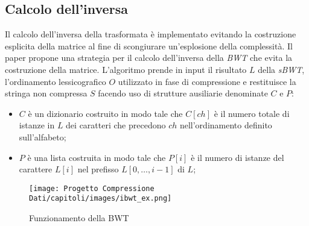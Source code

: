\subsection{Calcolo dell'inversa}
Il calcolo dell'inversa della trasformata è implementato evitando la costruzione esplicita della matrice al fine di scongiurare un'esplosione della complessità. Il paper \cite{burrows1994block} propone una strategia per il calcolo dell'inversa della \emph{BWT} che evita la costruzione della matrice. L'algoritmo prende in input il risultato $L$ della \emph{sBWT}, l'ordinamento lessicografico $O$ utilizzato in fase di compressione e restituisce la stringa non compressa $S$ facendo uso di strutture ausiliarie denominate $C$ e $P$:
\begin{itemize}
    \item $C$ è un dizionario costruito in modo tale che $C[ch]$ è il numero totale di istanze in $L$ dei caratteri che precedono $ch$ nell'ordinamento definito sull'alfabeto;
    \item $P$ è una lista costruita in modo tale che $P[i]$ è il numero di istanze del carattere $L[i]$ nel prefisso $L[0,\dots,i-1]$ di $L$;
\end{itemize}
\begin{figure}[h]
    \centering
    \texttt{[image: Progetto Compressione Dati/capitoli/images/ibwt\_ex.png]}
\caption{Funzionamento della BWT}
    \label{fig:ibwt_ex}
\end{figure} \\
